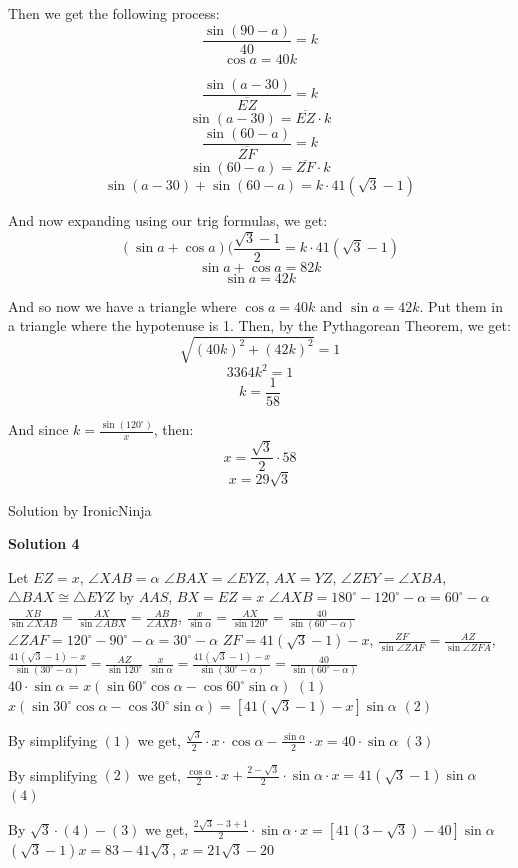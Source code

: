 \begin{enumerate}
 Then we get the following process:
 \[\frac{\sin(90-a)}{40} = k\]
 \[\cos a = 40k\]

 \[\frac{\sin(a-30)}{\overline{EZ}} = k\]
 \[\sin(a-30) = \overline{EZ}\cdot k\]
 \[\frac{\sin(60-a)}{\overline{ZF}} = k\]
 \[\sin(60-a) = \overline{ZF}\cdot k\]
 \[\sin(a-30) + \sin(60-a) = k\cdot 41(\sqrt{3}-1)\]

 And now expanding using our trig formulas, we get:
 \[(\sin a + \cos a)(\frac{\sqrt{3}-1}{2} = k\cdot 41(\sqrt{3}-1)\]
 \[\sin a + \cos a = 82k\]
 \[\sin a = 42k\]

 And so now we have a triangle where $\cos a = 40k$ and $\sin a = 42k$. Put them in a triangle where the hypotenuse is 1. Then, by the Pythagorean Theorem, we get:
 \[\sqrt{(40k)^2 + (42k)^2} = 1\]
 \[3364k^2 = 1\]
 \[k = \frac{1}{58}\]

 And since $k = \frac{\sin(120^{\circ})}{x}$, then:
 \[x = \frac{\sqrt{3}}{2}\cdot58\]
 \[x = \boxed{29\sqrt{3}}\]

 Solution by IronicNinja

 



\textbf{Solution 4}

Let $EZ = x$, $\angle XAB = \alpha$
$\angle BAX = \angle EYZ$, $AX = YZ$, $\angle ZEY = \angle XBA$, $\triangle BAX \cong \triangle EYZ$ by $AAS$, $BX = EZ = x$
$\angle AXB = 180^\circ - 120^\circ - \alpha = 60^\circ - \alpha$
$\frac{XB}{\sin \angle XAB} = \frac{AX}{\sin \angle ABX} = \frac{AB}{\angle AXB}$, $\frac{x}{\sin \alpha} = \frac{AX}{\sin 120^\circ} = \frac{40}{\sin (60^\circ - \alpha)}$
$\angle ZAF = 120^\circ - 90^\circ - \alpha = 30^\circ - \alpha$
$ZF = 41(\sqrt{3} - 1) - x$, $\frac{ZF}{\sin \angle ZAF} = \frac{AZ}{ \sin \angle ZFA}$, $\frac{41(\sqrt{3} - 1) - x}{\sin (30^\circ - \alpha)} = \frac{AZ}{ \sin 120^\circ}$
$\frac{x}{\sin \alpha} = \frac{41(\sqrt{3} - 1) - x}{\sin (30^\circ - \alpha)}= \frac{40}{\sin(60^\circ - \alpha)}$
$40 \cdot \sin \alpha = x(\sin 60^\circ \cos \alpha - \cos 60^\circ \sin \alpha)$ $(1)$
$x(\sin 30^\circ \cos \alpha - \cos 30^\circ \sin \alpha) = [41(\sqrt{3} - 1) - x] \sin \alpha$ $(2)$

 By simplifying $(1)$ we get, $\frac{\sqrt{3}}{2} \cdot x \cdot \cos \alpha - \frac{\sin \alpha}{2} \cdot x = 40 \cdot \sin \alpha$ $(3)$

 By simplifying $(2)$ we get, $\frac{\cos \alpha}{2} \cdot x + \frac{2 - \sqrt{3}}{2} \cdot \sin \alpha \cdot x = 41(\sqrt{3} - 1)\sin \alpha$ $(4)$

 By $\sqrt{3} \cdot (4) - (3)$ we get, $\frac{2\sqrt{3} - 3 +1}{2} \cdot \sin \alpha \cdot x = [41(3-\sqrt{3}) - 40] \sin \alpha$
$(\sqrt{3} - 1)x = 83 - 41\sqrt{3}$, $x = 21 \sqrt{3} - 20$


\end{enumerate}
